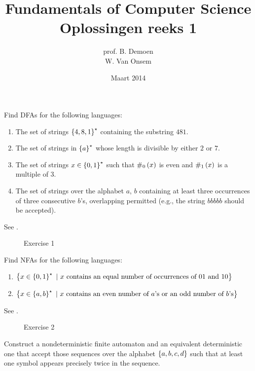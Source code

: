 \documentclass{article}
\title{Fundamentals of Computer Science\\Oplossingen reeks 1}
\author{prof. B. Demoen\\W. Van Onsem}
\date{Maart 2014}
\begin{document}
\maketitle
\begin{exercise}
Find DFAs for the following languages:
\begin{enumerate}
 \item The set of strings $\left\{ 4,8,1 \right\}^{\star}$ containing the substring $481$.
 \item The set of strings in $\left\{ a \right\}^{\star}$ whose length is divisible by either $2$ or $7$.
 \item The set of strings $x\in\left\{ 0,1 \right\}^{\star}$ such that $\#_0\left( x \right)$ is even and $\#_1\left( x \right)$ is a multiple of $3$.
 \item The set of strings over the alphabet $a$, $b$ containing at least three occurrences of three consecutive $b$'s, overlapping permitted (e.g., the string $bbbbb$ should be accepted).
\end{enumerate}
\begin{answer}See .
\begin{figure}[H]
\caption{Exercise 1}
\end{figure}
\end{answer}
\end{exercise}
\begin{exercise}
Find NFAs for the following languages:
\begin{enumerate}
 \item $\left\{ x\in\left\{ 0,1 \right\}^{\star}\ |\ \mbox{$x$ contains an equal number of occurrences of $01$ and $10$} \right\}$
 \item $\left\{ x\in\left\{ a,b \right\}^{\star}\ |\ \mbox{$x$ contains an even number of $a$'s or an odd number of $b$'s} \right\}$
\end{enumerate}
\begin{answer}See .
\begin{figure}[H]
\caption{Exercise 2}
\end{figure}
\end{answer}
\end{exercise}
\begin{exercise}
Construct a nondeterministic finite automaton and an equivalent deterministic one that accept those sequences over the alphabet $\left\{ a,b,c,d \right\}$ such that at least one symbol appears precisely twice in the sequence.
\begin{answer}
\end{answer}
\end{exercise}
\end{document}
